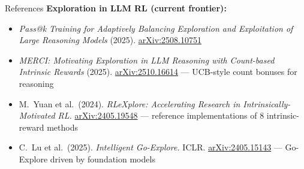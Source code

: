 \begin{frame}[allowframebreaks]{References}
\textbf{Exploration in LLM RL (current frontier):}
\begin{itemize}
    \item \emph{Pass@k Training for Adaptively Balancing Exploration and Exploitation of Large Reasoning Models} (2025). \href{https://arxiv.org/abs/2508.10751}{arXiv:2508.10751}
    \item \emph{MERCI: Motivating Exploration in LLM Reasoning with Count-based Intrinsic Rewards} (2025). \href{https://arxiv.org/abs/2510.16614}{arXiv:2510.16614} --- UCB-style count bonuses for reasoning
    \item M.~Yuan et al.\ (2024). \emph{RLeXplore: Accelerating Research in Intrinsically-Motivated RL.} \href{https://arxiv.org/abs/2405.19548}{arXiv:2405.19548} --- reference implementations of 8 intrinsic-reward methods
    \item C.~Lu et al.\ (2025). \emph{Intelligent Go-Explore.} ICLR. \href{https://arxiv.org/abs/2405.15143}{arXiv:2405.15143} --- Go-Explore driven by foundation models
\end{itemize}


\end{frame}
